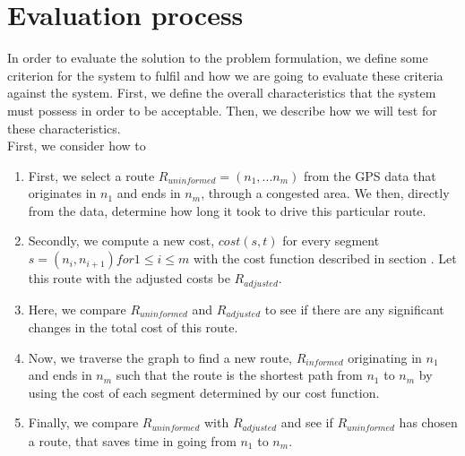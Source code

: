 \section{Evaluation process}
In order to evaluate the solution to the problem formulation, we define some criterion for the system to fulfil and how we are going to evaluate these criteria against the system. First, we define the overall characteristics that the system must possess in order to be acceptable. Then, we describe how we will test for these characteristics.
\\
First, we consider how to 


\begin{enumerate}
\item First, we select a route $R_{uninformed}=(n_1,...n_m)$ from the GPS data that originates in $n_1$ and ends in $n_m$, through a congested area. We then, directly from the data, determine how long it took to drive this particular route.
\item Secondly, we compute a new cost, $cost(s, t)$ for every segment $s=(n_i,n_{i+1}) for 1 \leq i \leq m$ with the cost function described in section . Let this route with the adjusted costs be $R_{adjusted}$.
\item Here, we compare $R_{uninformed}$ and $R_{adjusted}$ to see if there are any significant changes in the total cost of this route.
\item Now, we traverse the graph to find a new route, $R_{informed}$ originating in $n_1$ and ends in $n_m$ such that the route is the shortest path from $n_1$ to $n_m$ by using the cost of each segment determined by our cost function.
\item Finally, we compare $R_{uninformed}$ with $R_{adjusted}$ and see if $R_{uninformed}$ has chosen a route, that saves time in going from $n_1$ to $n_m$.
\end{enumerate}